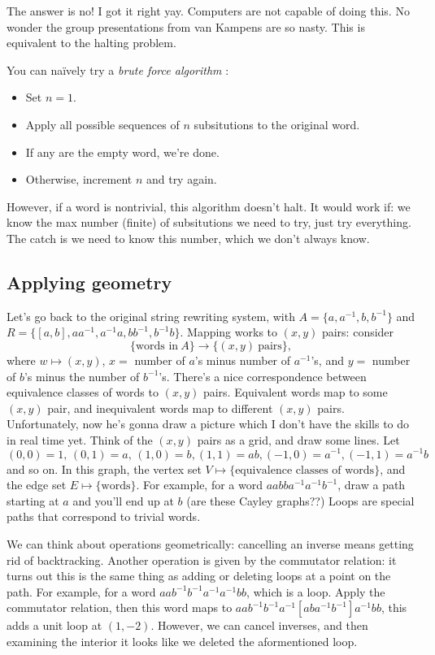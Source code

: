 The answer is no! I got it right yay. Computers are not capable of doing this. No wonder the group presentations from van Kampens are so nasty. This is equivalent to the halting problem.

    You can na\"ively try a \emph{brute force algorithm} :
\begin{itemize}
    \item Set $n=1$.
    \item Apply all possible sequences of $n$ subsitutions to the original word.
    \item If any are the empty word, we're done.
    \item Otherwise, increment $n$ and try again.
\end{itemize}
However, if a word is nontrivial, this algorithm doesn't halt. It would work if: we know the max number (finite) of subsitutions we need to try, just try everything. The catch is we need to know this number, which we don't always know. 

\subsection{Applying geometry}
Let's go back to the original string rewriting system, with $A=\{a,a^{-1},b,b^{-1}\} $ and $R=\{[a,b],aa^{-1},a^{-1}a,bb^{-1},b^{-1}b\} $. Mapping works to $(x,y)$ pairs: consider \[
    \{\text{words in} \ A\} \longrightarrow \{(x,y) \ \text{pairs}\} ,
\] where $w \mapsto (x,y)$, $x=$ number of $a$'s minus number of $a^{-1}$'s, and $y=$ number of $b$'s minus the number of $b^{-1}$'s. There's a nice correspondence between equivalence classes of words to $(x,y)$ pairs. Equivalent words map to some $(x,y)$ pair, and inequivalent words map to different $(x,y)$ pairs. Unfortunately, now he's gonna draw a picture which I don't have the skills to do in real time yet. Think of the $(x,y)$ pairs as a grid, and draw some lines. Let $(0,0)=1,\,(0,1)=a,\,(1,0)=b,(1,1)=ab,(-1,0)=a^{-1},(-1,1)=a^{-1}b$ and so on. In this graph, the vertex set $V \mapsto \{\text{equivalence classes of words}\} $, and the edge set $E \mapsto \{\text{words}\} $. For example, for a word $aabba^{-1}a^{-1}b^{-1}$, draw a path starting at $a$ and you'll end up at $b$ (are these Cayley graphs??) Loops are special paths that correspond to trivial words. 

We can think about operations geometrically: cancelling an inverse means getting rid of backtracking. Another operation is given by the commutator relation: it turns out this is the same thing as adding or deleting loops at a point on the path. For example, for a word $aab^{-1}b^{-1}a^{-1}a^{-1}bb$, which is a loop. Apply the commutator relation, then this word maps to $aab^{-1}b^{-1}a^{-1}[aba^{-1}b^{-1}]a^{-1}bb$, this adds a unit loop at $(1,-2)$. However, we can cancel inverses, and then examining the interior it looks like we deleted the aformentioned loop. 

